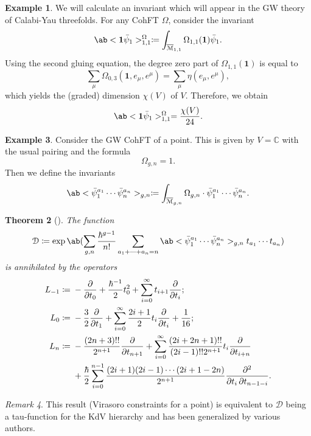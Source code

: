 \documentclass[10pt,oldfontcommands,oneside]{memoir}
\newtheorem{thm}{Theorem}[section]
\theoremstyle{definition}
\newtheorem{exm}[thm]{Example}
\theoremstyle{remark}
\newtheorem{rmk}[thm]{Remark}
\theoremstyle{plain}
\theoremstyle{definition}
\theoremstyle{remark}
\newcommand{\C}{\mathbb{C}}
\newcommand{\Mbar}{\overline{\mathcal{M}}}
\newcommand{\mc}[1]{\mathcal{#1}}
\newcommand{\1}{\mathbf{1}}
\newcommand{\2}{\mathbf{2}}
\newcommand{\3}{\mathbf{3}}
\begin{document}
\begin{exm}
    We will calculate an invariant which will appear in the GW theory of Calabi-Yau threefolds. For any CohFT $\Omega$, consider the invariant
    \[ \ab<\1\bar{\psi}_1>_{1,1}^{\Omega}\coloneqq \int_{\Mbar_{1,1}} \Omega_{1,1}(\1)\bar{\psi}_1. \]
    Using the second gluing equation, the degree zero part of $\Omega_{1,1}(\1)$ is equal to
    \[ \sum_{\mu} \Omega_{0,3}(\1, e_{\mu}, e^{\mu}) = \sum_{\mu} \eta(e_{\mu}, e^{\mu}), \]
    which yields the (graded) dimension $\chi(V)$ of $V$. Therefore, we obtain
    \[ \ab<\1\bar{\psi}_1>_{1,1}^{\Omega} = \frac{\chi(V)}{24}. \]
\end{exm}

\begin{exm}
    Consider the GW CohFT of a point. This is given by $V = \C$ with the usual pairing and the formula 
    \[ \Omega_{g,n} = 1. \]
    Then we define the invariants
    \[ \ab<\bar{\psi}_1^{a_1} \cdots \bar{\psi}_n^{a_n}>_{g,n} \coloneqq \int_{\Mbar_{g,n}} \Omega_{g,n} \cdot \bar{\psi}_1^{a_1} \cdots \bar{\psi}_n^{a_n}. \]
    \begin{thm}[{\cite{wittenconj}}]
        The function
        \[ \mc{D} \coloneqq \exp \ab(\sum_{g,n} \frac{\hbar^{g-1}}{n!}\sum_{a_1 + \cdots + a_n = n} \ab<\bar{\psi}_1^{a_1} \cdots \bar{\psi}_n^{a_n}>_{g,n} t_{a_1}\cdots t_{a_n}) \]
        is annihilated by the operators
        \begin{align*}
            L_{-1} \coloneqq{}& -\pdv{}{t_0} + \frac{\hbar^{-1}}{2} t_0^2 + \sum_{i=0}^{\infty} t_{i+1} \pdv{}{t_i};\\
            L_0 \coloneqq{}& -\frac{3}{2} \pdv{}{t_1} + \sum_{i=0}^{\infty} \frac{2i+1}{2} t_i \pdv{}{t_i} + \frac{1}{16};\\
            L_n \coloneqq{}& -\frac{(2n+3)!!}{2^{n+1}} \pdv{}{t_{n+1}} + \sum_{i=0}^{\infty} \frac{(2i+2n+1)!!}{(2i-1)!! 2^{n+1}} t_i \pdv{}{t_{i+n}} \\
            &+ \frac{\hbar}{2} \sum_{i=0}^{n-1} \frac{(2i+1) (2i-1) \cdots (2i+1-2n)}{2^{n+1}} \pdv{}{t_i,t_{n-1-i}}.
        \end{align*}
    \end{thm}
\end{exm}

\begin{rmk}
    This result (Virasoro constraints for a point) is equivalent to $\mc{D}$ being a tau-function for the KdV hierarchy and has been generalized by various authors.
\end{rmk}
\end{document}
